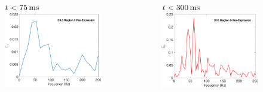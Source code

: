 \documentclass[aspectratio=169]{beamer}
\begin{document}
\begin{frame}

  \begin{columns}[c]

    \begin{figure}
      $t<75\,\mathrm{ms}$
      \includegraphics[width=1.0\textwidth]{Figures/D9.6_PreE.pdf}
    \end{figure}

    \begin{figure}
      $t<300\,\mathrm{ms}$
      \includegraphics[width=1.0\textwidth]{Figures/D15_PreE.pdf}
    \end{figure}


\end{columns}
\end{frame}
\end{document}
